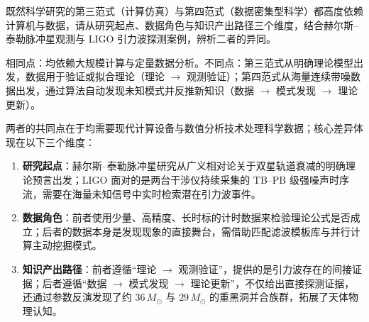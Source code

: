 \begin{exercise}[title={第三范式与第四范式辨析},level=standard,points=12,tags={第四范式,科学方法}]
既然科学研究的第三范式（计算仿真）与第四范式（数据密集型科学）都高度依赖计算机与数据，请从研究起点、数据角色与知识产出路径三个维度，结合赫尔斯–泰勒脉冲星观测与 LIGO 引力波探测案例，辨析二者的异同。
\begin{answer}
相同点：均依赖大规模计算与定量数据分析。不同点：第三范式从明确理论模型出发，数据用于验证或拟合理论（理论 $\to$ 观测验证）；第四范式从海量连续带噪数据出发，通过算法自动发现未知模式并反推新知识（数据 $\to$ 模式发现 $\to$ 理论更新）。
\end{answer}
\begin{solution}
两者的共同点在于均需要现代计算设备与数值分析技术处理科学数据；核心差异体现在以下三个维度：
\begin{enumerate}
  \item \textbf{研究起点}：赫尔斯–泰勒脉冲星研究从广义相对论关于双星轨道衰减的明确理论预言出发；LIGO 面对的是两台干涉仪持续采集的 TB–PB 级强噪声时序流，需要在海量未知信号中实时检索潜在引力波事件。
  \item \textbf{数据角色}：前者使用少量、高精度、长时标的计时数据来检验理论公式是否成立；后者的数据本身是发现现象的直接舞台，需借助匹配滤波模板库与并行计算主动挖掘模式。
  \item \textbf{知识产出路径}：前者遵循“理论 $\to$ 观测验证”，提供的是引力波存在的间接证据；后者遵循“数据 $\to$ 模式发现 $\to$ 理论更新”，不仅给出直接探测证据，还通过参数反演发现了约 $36\,M_\odot$ 与 $29\,M_\odot$ 的重黑洞并合族群，拓展了天体物理认知。
\end{enumerate}
\end{solution}
\end{exercise}

